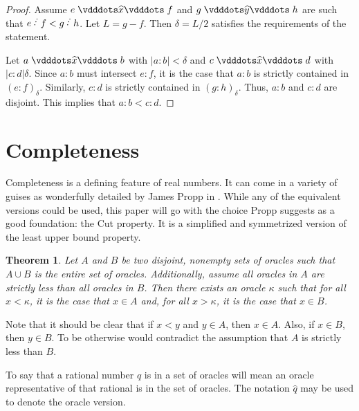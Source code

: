 \documentclass[12pt]{article}
\newtheorem{theorem}{Theorem}[section]
\begin{document}
\begin{proof}
    Assume $e \xora f$ and $g \xora[y] h$ are such that $e\lte f < g \lte h$. Let $L = g-f$. Then $\delta = L/2$ satisfies the requirements of the statement. 

    Let $a \xora b$ with $|a:b| < \delta$ and $c \xora d$ with $|c:d| \delta$. Since $a:b$ must intersect $e:f$, it is the case that $a:b$ is strictly contained in $(e:f)_\delta$. Similarly, $c:d$ is strictly contained in $(g:h)_\delta$. Thus, $a:b$ and $c:d$ are disjoint. This implies that $a:b < c:d$. 
\end{proof}


\section{Completeness}

Completeness is a defining feature of real numbers. It can come in a variety of guises as wonderfully detailed by James Propp in \cite{propp}. While any of the equivalent versions could be used, this paper will go with the choice Propp suggests as a good foundation: the Cut property. It is a simplified and symmetrized version of the least upper bound property. 

\begin{theorem}\label{th:cut}
    Let $A$ and $B$ be two disjoint, nonempty sets of oracles such that $A \cup B$ is the entire set of oracles.  Additionally, assume all oracles in $A$ are strictly less than all oracles in $B$. Then there exists an oracle $\kappa$ such that for all $x < \kappa$, it is the case that $x \in A$ and, for all $x > \kappa$, it is the case that $x \in B$.
\end{theorem}

Note that it should be clear that if $x < y$ and $y \in A$, then $x  \in A$. Also, if $x \in B$, then $y \in B$. To be otherwise would contradict the assumption that $A$ is strictly less than $B$. 

To say that a rational number $q$ is in a set of oracles will mean an oracle representative of that rational is in the set of oracles. The notation $\widehat{q}$ may be used to denote the oracle version.
\end{document}
